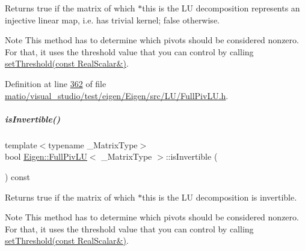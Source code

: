 \begin{DoxyReturn}{Returns}
true if the matrix of which $\ast$this is the LU decomposition represents an injective linear map, i.\+e. has trivial kernel; false otherwise.
\end{DoxyReturn}
\begin{DoxyNote}{Note}
This method has to determine which pivots should be considered nonzero. For that, it uses the threshold value that you can control by calling \hyperlink{group___l_u___module_a414592d82de98f5bd075965caf56d681}{set\+Threshold(const Real\+Scalar\&)}. 
\end{DoxyNote}


Definition at line \hyperlink{matio_2visual__studio_2test_2eigen_2_eigen_2src_2_l_u_2_full_piv_l_u_8h_source_l00362}{362} of file \hyperlink{matio_2visual__studio_2test_2eigen_2_eigen_2src_2_l_u_2_full_piv_l_u_8h_source}{matio/visual\+\_\+studio/test/eigen/\+Eigen/src/\+L\+U/\+Full\+Piv\+L\+U.\+h}.

\mbox{\label{group___l_u___module_afdf2579c93473650f2ef2a47a376c4a0}} 
\subparagraph{\texorpdfstring{is\+Invertible()}{isInvertible()}\hspace{0.1cm}{\footnotesize\ttfamily [1/2]}}
{\footnotesize\ttfamily template$<$typename \+\_\+\+Matrix\+Type$>$ \\
bool \hyperlink{group___l_u___module_class_eigen_1_1_full_piv_l_u}{Eigen\+::\+Full\+Piv\+LU}$<$ \+\_\+\+Matrix\+Type $>$\+::is\+Invertible (\begin{DoxyParamCaption}{ }\end{DoxyParamCaption}) const\hspace{0.3cm}{\ttfamily [inline]}}

\begin{DoxyReturn}{Returns}
true if the matrix of which $\ast$this is the LU decomposition is invertible.
\end{DoxyReturn}
\begin{DoxyNote}{Note}
This method has to determine which pivots should be considered nonzero. For that, it uses the threshold value that you can control by calling \hyperlink{group___l_u___module_a414592d82de98f5bd075965caf56d681}{set\+Threshold(const Real\+Scalar\&)}. 
\end{DoxyNote}


